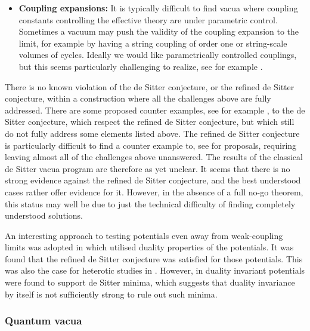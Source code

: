 \documentclass[11pt,a4paper]{article}
\numberwithin{equation}{section}
\numberwithin{table}{section}\setlength{\multlinegap}{25pt}
\begin{document}
{\begin{itemize}
\item {\bf Coupling expansions:} It is typically difficult to find vacua where coupling constants controlling the effective theory are under parametric control. Sometimes a vacuum may push the validity of the coupling expansion to the limit, for example by having a string coupling of order one or string-scale volumes of cycles. Ideally we would like parametrically controlled couplings, but this seems particularly challenging to realize, see for example \cite{Banlaki:2018ayh}.
\end{itemize}
There is no known violation of the de Sitter conjecture, or the refined de Sitter conjecture, within a construction where all the challenges above are fully addressed. There are some proposed counter examples, see for example \cite{Caviezel:2008tf,Flauger:2008ad,Danielsson:2009ff,Caviezel:2009tu,Danielsson:2010bc}, to the de Sitter conjecture, which respect the refined de Sitter conjecture, but which still do not fully address some elements listed above. The refined de Sitter conjecture is particularly difficult to find a counter example to, see \cite{Blaback:2018hdo,Blaback:2019zig} for proposals, requiring leaving almost all of the challenges above unanswered. The results of the classical de Sitter vacua program are therefore as yet unclear. It seems that there is no strong evidence against the refined de Sitter conjecture, and the best understood cases rather offer evidence for it. However, in the absence of a full no-go theorem, this status may well be due to just the technical difficulty of finding completely understood solutions.

An interesting approach to testing potentials even away from weak-coupling limits was adopted in \cite{Gonzalo:2018guu} which utilised duality properties of the potentials. It was found that the refined de Sitter conjecture was satisfied for those potentials. This was also the case for heterotic studies in \cite{Parameswaran:2010ec,Olguin-Tejo:2018pfq}. However, in \cite{Blaback:2013qza} duality invariant potentials were found to support de Sitter minima, which suggests that duality invariance by itself is not sufficiently strong to rule out such minima.

\subsubsection{Quantum vacua}
\label{sec:dskklt}

}
\end{document}
